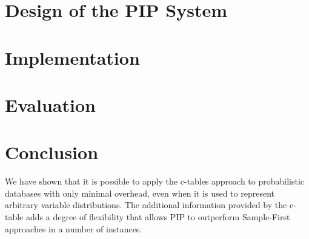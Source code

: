 \documentclass{sig-alternate}
\begin{document}
\section{Design of the PIP System}
\label{sec:design}


\section{Implementation}
\label{sec:implementation}


\section{Evaluation}
\label{sec:evaluation}



\section{Conclusion}

We have shown that it is possible to apply the c-tables approach to probabilistic databases with only minimal overhead, even when it is used to represent arbitrary variable distributions.  The additional information provided by the c-table adds a degree of flexibility that allows PIP to outperform Sample-First approaches in a number of instances.

\begin{small}


\end{small}
\end{document}
